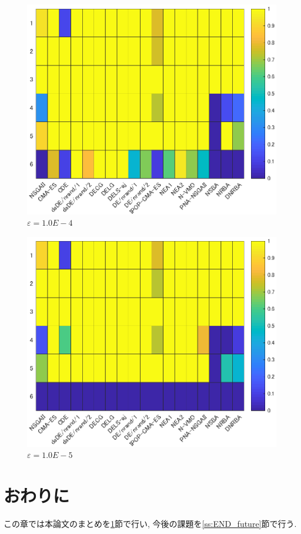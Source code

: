 \documentclass[a4j,11pt]{jarticle}
\begin{document}
\begin{figure}
\centering
\includegraphics[width=0.8\linewidth]{eps/E-4.eps}
\caption{$\varepsilon = 1.0E-4$}
\label{fig:resutls_comp_E4}
\end{figure}
\begin{figure}
\centering
\includegraphics[width=0.8\linewidth]{eps/E-5.eps}
\caption{$\varepsilon = 1.0E-5$}
\label{fig:resutls_comp_E5}
\end{figure}


\FloatBarrier


\clearpage
\section{おわりに}
\label{sec:END}
この章では本論文のまとめを\ref{sec:END}節で行い, 今後の課題を\ref{ss:END_future}節で行う.
\end{document}
